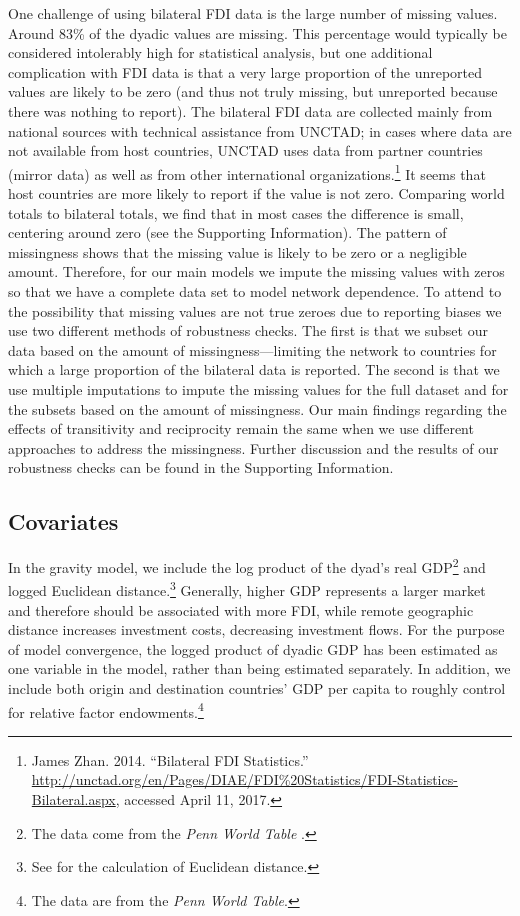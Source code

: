 \documentclass[reqno,onecolumn,letterpaper,12pt]{article}
\begin{document}
One challenge of using bilateral FDI data is the large number of missing values. %
Around 83\% of the dyadic values are missing. This percentage would typically be considered intolerably high for statistical analysis, but one additional complication with FDI data is that a very large proportion of the unreported values are likely to be zero (and thus not truly missing, but unreported because there was nothing to report). The bilateral FDI data are collected mainly from national sources with technical assistance from UNCTAD; in cases where data are not available from host countries, UNCTAD uses data from partner countries (mirror data) as well as from other international organizations.\footnote{James Zhan. 2014. ``Bilateral FDI Statistics.'' \url{http://unctad.org/en/Pages/DIAE/FDI\%20Statistics/FDI-Statistics-Bilateral.aspx}, accessed April 11, 2017.}
It seems that host countries are more likely to report if the value is not zero. Comparing world totals to bilateral totals, we find that in most cases the difference is small, centering around zero (see the Supporting Information). The pattern of missingness shows that the missing value is likely to be zero or a negligible amount. Therefore, for our main models we impute the missing values with zeros so that we have a complete data set to model network dependence. To attend to the possibility that missing values are not true zeroes due to reporting biases we use two different methods of robustness checks. The first is that we subset our data based on the amount of missingness---limiting the network to countries for which a large proportion of the bilateral data is reported. The second is that we use multiple imputations to impute the missing values for the full dataset and for the subsets based on the amount of missingness. Our main findings regarding the effects of transitivity and reciprocity remain the same when we use different approaches to address the missingness. Further discussion and the results of our robustness checks can be found in the Supporting Information.




\subsection{Covariates}

In the gravity model, we include the log product of the dyad's real GDP\footnote{The data come from the \textit{Penn World Table}  \citep{feenstra2015next}.} and logged Euclidean distance.\footnote{See \citet{mayer2011notes} for the calculation of Euclidean distance.} Generally, higher GDP represents a larger market and therefore should be associated with more FDI, while remote geographic distance increases investment costs, decreasing investment flows. For the purpose of model convergence, the logged product of dyadic GDP has been estimated as one variable in the model, rather than being estimated separately. In addition, we include both origin and destination countries' GDP per capita to roughly control for relative factor endowments.\footnote{The data are from the \textit{Penn World Table}.}
\end{document}
